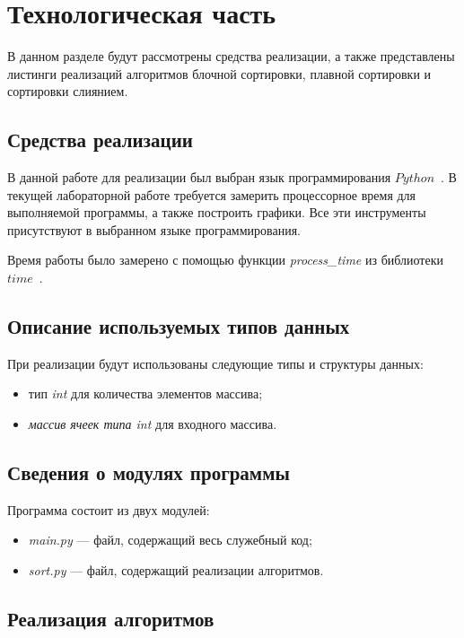 \chapter{Технологическая часть}

В данном разделе будут рассмотрены средства реализации, а также представлены листинги реализаций алгоритмов блочной сортировки, плавной сортировки и сортировки слиянием.

\section{Средства реализации}

В данной работе для реализации был выбран язык программирования $Python$~\cite{python-lang}. В текущей лабораторной работе требуется замерить процессорное время для выполняемой программы, а также построить графики. Все эти инструменты присутствуют в выбранном языке программирования.

Время работы было замерено с помощью функции \textit{process\_time} из библиотеки $time$~\cite{python-lang-time}.

\section{Описание используемых типов данных}

При реализации будут использованы следующие типы и структуры данных:

\begin{itemize}[label=---]
	\item тип \textit{int} для количества элементов массива;
	\item \textit{массив ячеек типа int} для входного массива.
\end{itemize}

\section{Сведения о модулях программы}

Программа состоит из двух модулей:
\begin{itemize}[label={---}]
	\item \textit{main.py} --- файл, содержащий весь служебный код;
	\item \textit{sort.py} --- файл, содержащий реализации алгоритмов.
\end{itemize}

\section{Реализация алгоритмов}

